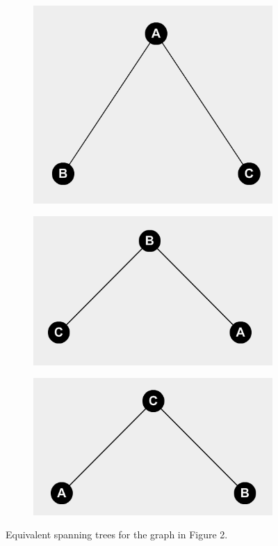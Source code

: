 \documentclass{article}
\begin{document}
\begin{figure}[H]
    \centering
    \begin{subfigure}{.32\textwidth}
        \centering
        \includegraphics[width=.75\linewidth, height=.2\textheight]{MST1}
    \end{subfigure}
    \begin{subfigure}{.32\textwidth}
        \centering
        \includegraphics[width=.75\linewidth, height=.2\textheight]{MST2}
    \end{subfigure}
    \begin{subfigure}{.32\textwidth}
        \centering
        \includegraphics[width=.75\linewidth, height=.2\textheight]{MST3}
    \end{subfigure}
    \caption{Equivalent spanning trees for the graph in Figure 2.}
\end{figure}
\end{document}
